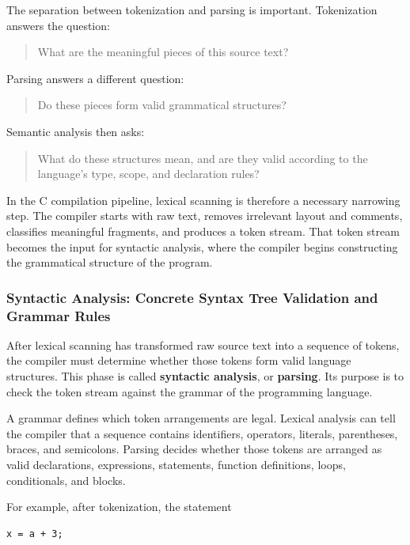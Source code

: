 The separation between tokenization and parsing is important. Tokenization answers the question:

\begin{quote}
What are the meaningful pieces of this source text?
\end{quote}

Parsing answers a different question:

\begin{quote}
Do these pieces form valid grammatical structures?
\end{quote}

Semantic analysis then asks:

\begin{quote}
What do these structures mean, and are they valid according to the language's type, scope, and declaration rules?
\end{quote}

In the C compilation pipeline, lexical scanning is therefore a necessary narrowing step. The compiler starts with raw text, removes irrelevant layout and comments, classifies meaningful fragments, and produces a token stream. That token stream becomes the input for syntactic analysis, where the compiler begins constructing the grammatical structure of the program.


\subsubsection{Syntactic Analysis: Concrete Syntax Tree Validation and Grammar Rules}

After lexical scanning has transformed raw source text into a sequence of tokens, the compiler must determine whether those tokens form valid language structures. This phase is called \textbf{syntactic analysis}, or \textbf{parsing}. Its purpose is to check the token stream against the grammar of the programming language.

A grammar defines which token arrangements are legal. Lexical analysis can tell the compiler that a sequence contains identifiers, operators, literals, parentheses, braces, and semicolons. Parsing decides whether those tokens are arranged as valid declarations, expressions, statements, function definitions, loops, conditionals, and blocks.

For example, after tokenization, the statement

\begin{verbatim}
x = a + 3;
\end{verbatim}

